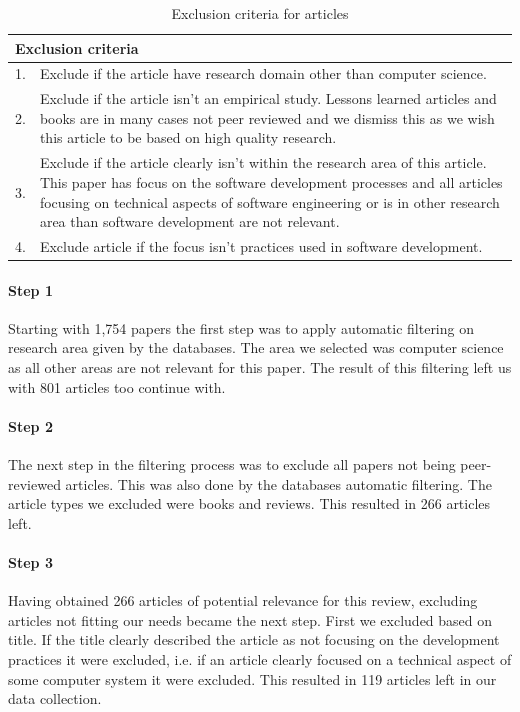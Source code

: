 \documentclass[12pt]{article}
\begin{document}
\begin{table}[h!]
	\begin{center}
		\caption{Exclusion criteria for articles}
		\label{table:datacriteria}
		\begin{tabular}{l p{}}
		 	\multicolumn{2}{l}{Exclusion criteria}\\
		 	\hline
			1. & Exclude if the article have research domain other than computer science. \\
			2. & Exclude if the article isn't an empirical study. Lessons learned articles and books are in many cases not peer reviewed and we dismiss this as we wish this article to be based on high quality research. \\
			3. & Exclude if the article clearly isn't within the research area of this article. This paper has focus on the software development processes and all articles focusing on technical aspects of software engineering or is in other research area than software development are not relevant. \\
			4. & Exclude article if the focus isn't practices used in software development. \\
		\end{tabular}
	\end{center}
\end{table}

\paragraph{Step 1}
Starting with 1,754 papers the first step was to apply automatic filtering on research area given by the databases. The area we selected was computer science as all other areas are not relevant for this paper. The result of this filtering left us with 801 articles too continue with. 

\paragraph{Step 2}
The next step in the filtering process was to exclude all papers not being peer-reviewed articles. This was also done by the databases automatic filtering. The article types we excluded were books and reviews. This resulted in 266 articles left. 

\paragraph{Step 3}
Having obtained 266 articles of potential relevance for this review, excluding articles not fitting our needs became the next step. First we excluded based on title. If the title clearly described the article as not focusing on the development practices it were excluded, i.e. if an article clearly focused on a technical aspect of some computer system it were excluded. This resulted in 119 articles left in our data collection. 
\end{document}
